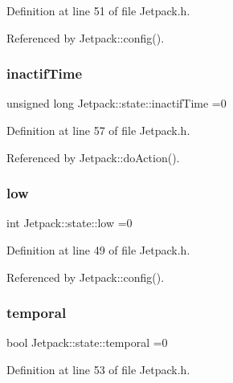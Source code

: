 Definition at line 51 of file Jetpack.\+h.



Referenced by Jetpack\+::config().

\mbox{\label{structJetpack_1_1state_aaf817b1f9e7a4d65b9e3ca4726b281f6}} 
\subsubsection{\texorpdfstring{inactif\+Time}{inactifTime}}
{\footnotesize\ttfamily unsigned long Jetpack\+::state\+::inactif\+Time =0}



Definition at line 57 of file Jetpack.\+h.



Referenced by Jetpack\+::do\+Action().

\mbox{\label{structJetpack_1_1state_ace3ecd2b1f262756d8f7a8adda20136a}} 
\subsubsection{\texorpdfstring{low}{low}}
{\footnotesize\ttfamily int Jetpack\+::state\+::low =0}



Definition at line 49 of file Jetpack.\+h.



Referenced by Jetpack\+::config().

\mbox{\label{structJetpack_1_1state_abd6039e7a48856550b0ffbf8bcff7bdd}} 
\subsubsection{\texorpdfstring{temporal}{temporal}}
{\footnotesize\ttfamily bool Jetpack\+::state\+::temporal =0}



Definition at line 53 of file Jetpack.\+h.




